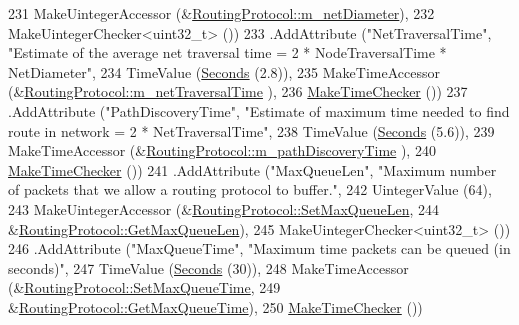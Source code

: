 \begin{DoxyCode}
231                    MakeUintegerAccessor (&\hyperlink{classns3_1_1aodv_1_1RoutingProtocol_a563c2234b89a44628f8e71b38e7c60ec}{RoutingProtocol::m\_netDiameter}),
232                    MakeUintegerChecker<uint32\_t> ())
233     .AddAttribute (\textcolor{stringliteral}{"NetTraversalTime"}, \textcolor{stringliteral}{"Estimate of the average net traversal time = 2 * NodeTraversalTime
       * NetDiameter"},
234                    TimeValue (\hyperlink{group__timecivil_ga33c34b816f8ff6628e33d5c8e9713b9e}{Seconds} (2.8)),
235                    MakeTimeAccessor (&\hyperlink{classns3_1_1aodv_1_1RoutingProtocol_a4642e67ba68a7ef40405f5773650ea1a}{RoutingProtocol::m\_netTraversalTime}
      ),
236                    \hyperlink{group__time_ga7032965bd4afa578691d88c09e4481c1}{MakeTimeChecker} ())
237     .AddAttribute (\textcolor{stringliteral}{"PathDiscoveryTime"}, \textcolor{stringliteral}{"Estimate of maximum time needed to find route in network = 2 *
       NetTraversalTime"},
238                    TimeValue (\hyperlink{group__timecivil_ga33c34b816f8ff6628e33d5c8e9713b9e}{Seconds} (5.6)),
239                    MakeTimeAccessor (&\hyperlink{classns3_1_1aodv_1_1RoutingProtocol_a491c2fe5559a8153343df590999b468f}{RoutingProtocol::m\_pathDiscoveryTime}
      ),
240                    \hyperlink{group__time_ga7032965bd4afa578691d88c09e4481c1}{MakeTimeChecker} ())
241     .AddAttribute (\textcolor{stringliteral}{"MaxQueueLen"}, \textcolor{stringliteral}{"Maximum number of packets that we allow a routing protocol to buffer."},
242                    UintegerValue (64),
243                    MakeUintegerAccessor (&\hyperlink{classns3_1_1aodv_1_1RoutingProtocol_a852b0099e96031ff62da030f773720ac}{RoutingProtocol::SetMaxQueueLen},
244                                          &\hyperlink{classns3_1_1aodv_1_1RoutingProtocol_a083d3102e6470b92f3027bc771a9b454}{RoutingProtocol::GetMaxQueueLen}),
245                    MakeUintegerChecker<uint32\_t> ())
246     .AddAttribute (\textcolor{stringliteral}{"MaxQueueTime"}, \textcolor{stringliteral}{"Maximum time packets can be queued (in seconds)"},
247                    TimeValue (\hyperlink{group__timecivil_ga33c34b816f8ff6628e33d5c8e9713b9e}{Seconds} (30)),
248                    MakeTimeAccessor (&\hyperlink{classns3_1_1aodv_1_1RoutingProtocol_a6da1de88e09c9f1fa1983713b5fdbac7}{RoutingProtocol::SetMaxQueueTime},
249                                      &\hyperlink{classns3_1_1aodv_1_1RoutingProtocol_acc957689cc3f248baaaf256b4f146a59}{RoutingProtocol::GetMaxQueueTime}),
250                    \hyperlink{group__time_ga7032965bd4afa578691d88c09e4481c1}{MakeTimeChecker} ())

\end{DoxyCode}
